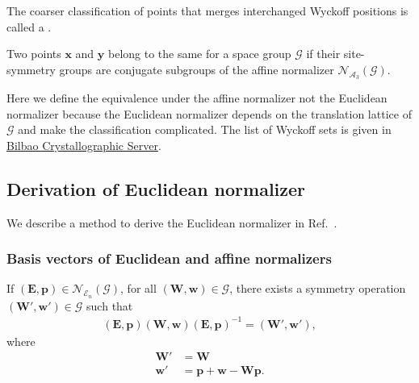 
The coarser classification of points that merges interchanged Wyckoff positions is called a .
\begin{screen}
  \begin{defn}
    Two points $\bm{x}$ and $\bm{y}$ belong to the same  for a space group $\mathcal{G}$ if their site-symmetry groups are conjugate subgroups of the affine normalizer $\mathcal{N}_{\mathcal{A}_{3}}(\mathcal{G})$.
  \end{defn}
\end{screen}
Here we define the equivalence under the affine normalizer not the Euclidean normalizer because the Euclidean normalizer depends on the translation lattice of $\mathcal{G}$ and make the classification complicated.
The list of Wyckoff sets is given in \href{https://www.cryst.ehu.es/html/cryst/wyckoffsets.html}{Bilbao Crystallographic Server}.

%

\subsection{Derivation of Euclidean normalizer}

We describe a method to derive the Euclidean normalizer in Ref.~\cite{Boisen:bx0358}.

\subsubsection{Basis vectors of Euclidean and affine normalizers}

If $( \bm{E}, \bm{p} ) \in \mathcal{N}_{\mathcal{E}_{n}}(\mathcal{G}) $, for all $(\bm{W}, \bm{w} ) \in \mathcal{G}$, there exists a symmetry operation $(\bm{W}', \bm{w}' ) \in \mathcal{G}$ such that
\begin{align}
  (\bm{E}, \bm{p}) (\bm{W}, \bm{w}) (\bm{E}, \bm{p})^{-1} = (\bm{W}', \bm{w}'),
\end{align}
where
\begin{align}
  \bm{W}' &= \bm{W} \\
  \bm{w}' &= \bm{p} + \bm{w} - \bm{Wp}.
\end{align}


